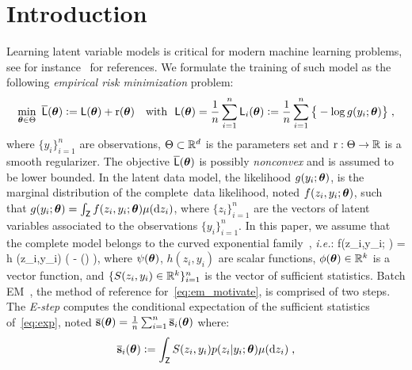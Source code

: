 \documentclass[12pt]{article}
\begin{document}
\section{Introduction}


Learning latent variable models is critical for modern machine learning problems, see for instance~\citet{mclachlan2007algorithm} for references.
We formulate the training of such model as the following \emph{empirical risk minimization} problem:
\begin{align} \label{eq:em_motivate}
\begin{split} 
 \min_{ {\bm{\theta}} \in \Theta }~ \overline{{\textsf{L}}} ( {\bm{\theta}} ) \mathrel{\mathop:}=  {\textsf{L}} ( {\bm{\theta}} ) + \operatorname{r} ({\bm{\theta}}) \quad \text{with}~~{\textsf{L}} ( {\bm{\theta}} ) = \frac{1}{n} \sum_{i=1}^n {\textsf{L}}_i( {\bm{\theta}}) \mathrel{\mathop:}=  \frac{1}{n} \sum_{i=1}^n \big\{ - \log g( y_i ; {\bm{\theta}} ) \big\}\;,
\end{split} 
\end{align}
where $\{y_i\}_{i=1}^n$ are observations, $\Theta \subset \mathbb{R}^d$ is the parameters set and $\operatorname{r} : \Theta \rightarrow \mathbb{R}$ is a smooth regularizer.
The objective $ \overline{{\textsf{L}}} ( {\bm{\theta}} )$ is possibly \emph{nonconvex} and is assumed to be lower bounded. 
In the latent data model, the likelihood $g(y_i ; {\bm{\theta}})$, is the marginal distribution of the complete~data likelihood, noted $f(z_i,y_i; {\bm{\theta}})$, such that $g(y_i; {\bm{\theta}}) = \int_{\mathsf{Z}} f (z_i,y_i;{\bm{\theta}}) \mu(\mathrm d z_i)$, where $\{ z_i \}_{i=1}^n$ are the vectors of latent variables associated to the observations $\{y_i\}_{i=1}^n$.
In this paper, we assume that the complete model belongs to the curved exponential family~\citep{efron1975defining}, \textit{i.e.}:
\beq \label{eq:exp}
f(z_i,y_i; \param) = h  (z_i,y_i) \exp (  - \psi(\param) )\eqs,
\eeq
where $\psi({\bm{\theta}})$, $h(z_i,y_i)$ are scalar functions, $\phi({\bm{\theta}}) \in \mathbb{R}^k$ is a vector function, and $\{S(z_i,y_i) \in \mathbb{R}^k\}_{i=1}^n$ is the vector of sufficient statistics.
Batch EM~\citep{dempster1977Maximum, wu1983convergence}, the method of reference for~\eqref{eq:em_motivate}, is comprised of two steps. 
The \textit{E-step} computes the conditional expectation of the sufficient statistics of~\eqref{eq:exp}, noted $\overline{{\mathbf{s}}}({\bm{\theta}})= \frac{1}{n} \sum_{i=1}^n \overline{{\mathbf{s}}}_i({\bm{\theta}})$ where:
\begin{align}\label{eq:definition-overline-bss}
 \overline{{\mathbf{s}}}_i({\bm{\theta}}) \mathrel{\mathop:}= \int_{\mathsf{Z}} S(z_i,y_i) p(z_i|y_i;{\bm{\theta}}) \mu(\mathrm d z_i) \;,
\end{align}
\end{document}

